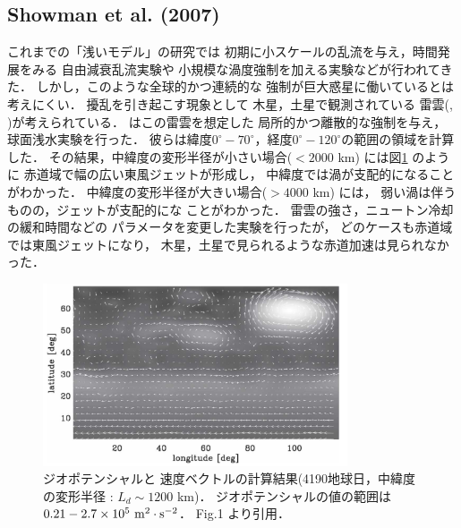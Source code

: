 \documentclass[a4j,12pt,openbib,oneside]{jreport}
\begin{document}
\subsection{Showman et al. (2007)}
\label{sec:intro21}
これまでの「浅いモデル」の研究では
初期に小スケールの乱流を与え，時間発展をみる
自由減衰乱流実験\citep{Yoden1993}や
小規模な渦度強制を加える実験\citep{Scott2007}などが行われてきた．
%
しかし，このような全球的かつ連続的な
強制が巨大惑星に働いているとは考えにくい．
%
擾乱を引き起こす現象として
木星，土星で観測されている
雷雲(\cite{Gierasch2000}, \cite{Porco2005})が考えられている．
%
\cite{Showman2007}はこの雷雲を想定した
局所的かつ離散的な強制を与え，球面浅水実験を行った．
彼らは緯度$0^\circ - 70^\circ$，経度$0^\circ - 120^\circ$の範囲の領域を計算した．
その結果，中緯度の変形半径が小さい場合($< 2000$ km) には図\ref{fig3} のように
赤道域で幅の広い東風ジェットが形成し，
中緯度では渦が支配的になることがわかった．
%
中緯度の変形半径が大きい場合($> 4000$ km) には，
弱い渦は伴うものの，ジェットが支配的にな
ことがわかった．
%
雷雲の強さ，ニュートン冷却の緩和時間などの
パラメータを変更した実験を行ったが，
どのケースも赤道域では東風ジェットになり，
木星，土星で見られるような赤道加速は見られなかった．
%
\begin{figure}[H]
  \begin{center}
    \includegraphics[clip,width=9cm]{./fig/intro/fig3.png}
    \caption{
      \footnotesize{ジオポテンシャルと
速度ベクトルの計算結果(4190地球日，中緯度の変形半径 : $L_d \sim 1200$ km)．
ジオポテンシャルの値の範囲は$0.21 - 2.7 \times 10^5 \rm{~m^2 \cdot s^{-2}}$．
\cite{Showman2007} Fig.1 より引用．
      }
    }
    \label{fig3}
  \end{center}
\end{figure}
%
\end{document}
